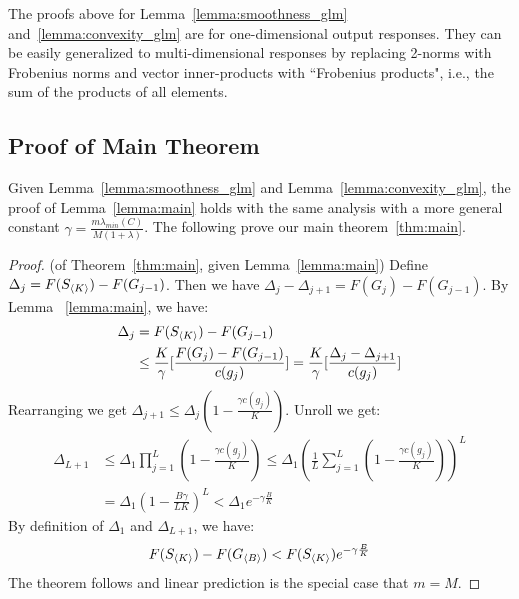 The proofs above for Lemma~\ref{lemma:smoothness_glm} and~\ref{lemma:convexity_glm} are 
for one-dimensional output responses. They can be easily generalized to multi-dimensional 
responses by replacing 2-norms with Frobenius norms and vector inner-products with ``Frobenius products", i.e., the sum of the products of all elements. \\

\subsection{Proof of Main Theorem}
\label{sec:app-main-proof}
Given Lemma~\ref{lemma:smoothness_glm} and Lemma~\ref{lemma:convexity_glm}, 
the proof of Lemma~\ref{lemma:main} holds with the same analysis with a more 
general constant $\gamma = \frac{m \lambda_{min}(C)}{M(1+\lambda)}$. The following prove our main theorem~\ref{thm:main}. 
 
\begin{proof} (of Theorem~\ref{thm:main}, given Lemma~\ref{lemma:main})
\label{proof:main}
  Define $\Delta _j = F(S_{\langle K \rangle}) - F(G_{j-1})$. Then we have 
  $\Delta _j - \Delta_{j+1} = F(G_{j}) - F(G_{j-1})$. By Lemma ~\ref{lemma:main}, we have:
  \begin{align*}
    \Delta_j &= F(S_{\langle K \rangle}) - F(G_{j-1})\\
    &\leq \frac{K}{\gamma}
      \lbrack \frac{F(G_{j}) - F(G_{j-1})}{c(g_{j})} \rbrack 
        = \frac{K}{\gamma} \lbrack \frac{\Delta_j - \Delta_{j+1}}{c(g_j)} \rbrack
  \end{align*}
  Rearranging we get 
    $\Delta_{j+1} \leq \Delta_j ( 1 - \frac{\gamma c(g_j)}{K} )$. Unroll we get:
  \begin{align*}
    \Delta _{L+1} 
    &\leq 
      \Delta _1 \prod _{j=1}^L (1 - \frac{\gamma c(g_j)}{K})
    \leq \Delta _1 ( \frac{1}{L} \sum _{j=1}^L (1- \frac{\gamma c(g_j)}{K})) ^L\\
    &= \Delta _1 (1 - \frac{B\gamma}{L K})^L < \Delta_1 e^{- \gamma \frac{B}{K}}
  \end{align*}
  By definition of $\Delta_1$ and $\Delta_{L+1}$, we have:
  \begin{align*}
    F(S_{\langle K \rangle}) - F(G_{\langle B \rangle}) < F(S_{\langle K \rangle}) e^{- \gamma \frac{B}{K}}
  \end{align*}
  The theorem follows and linear prediction is the special case that $m = M$.
\end{proof}
